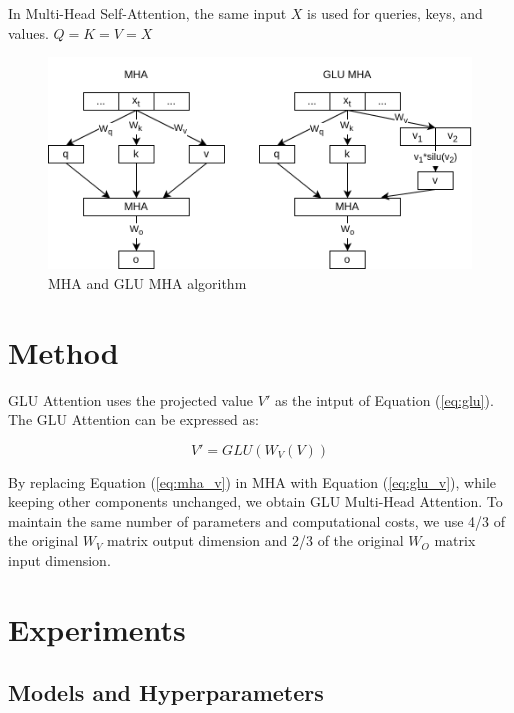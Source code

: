 \documentclass[11pt]{article}
\begin{document}
In Multi-Head Self-Attention, the same input $X$ is used for queries, keys, and values. $Q = K = V = X$

\begin{figure}[htbp]
    \centering
    
    \begin{minipage}{0.65\textwidth}
    \includegraphics[width=\textwidth]{GLU_Attention.png}
    \caption{MHA and GLU MHA algorithm}
    \end{minipage}
\end{figure}

\section{Method}
GLU Attention uses the projected value $V'$ as the intput of Equation (\ref{eq:glu}). The GLU Attention can be expressed as:

\begin{equation}
V' = GLU(W_V(V))
\label{eq:glu_v}
\end{equation}

By replacing Equation (\ref{eq:mha_v}) in MHA with Equation (\ref{eq:glu_v}), while keeping other components unchanged, we obtain GLU Multi-Head Attention. To maintain the same number of parameters and computational costs, we use 4/3 of the original $W_V$ matrix output dimension and 2/3 of the original $W_O$ matrix input dimension.

\section{Experiments}

\subsection{Models and Hyperparameters}
\end{document}
